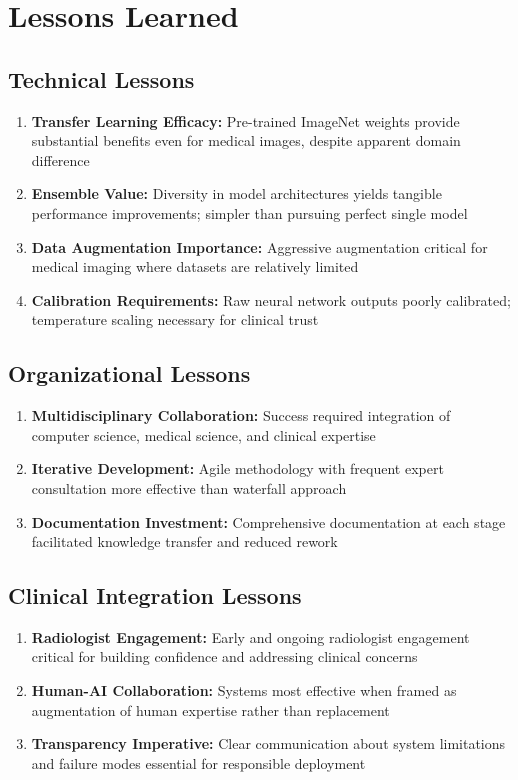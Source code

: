 {\section{Lessons Learned}

\subsection{Technical Lessons}

\begin{enumerate}
    \item \textbf{Transfer Learning Efficacy:} Pre-trained ImageNet weights provide substantial benefits even for medical images, despite apparent domain difference
    \item \textbf{Ensemble Value:} Diversity in model architectures yields tangible performance improvements; simpler than pursuing perfect single model
    \item \textbf{Data Augmentation Importance:} Aggressive augmentation critical for medical imaging where datasets are relatively limited
    \item \textbf{Calibration Requirements:} Raw neural network outputs poorly calibrated; temperature scaling necessary for clinical trust
\end{enumerate}

\subsection{Organizational Lessons}

\begin{enumerate}
    \item \textbf{Multidisciplinary Collaboration:} Success required integration of computer science, medical science, and clinical expertise
    \item \textbf{Iterative Development:} Agile methodology with frequent expert consultation more effective than waterfall approach
    \item \textbf{Documentation Investment:} Comprehensive documentation at each stage facilitated knowledge transfer and reduced rework
\end{enumerate}

\subsection{Clinical Integration Lessons}

\begin{enumerate}
    \item \textbf{Radiologist Engagement:} Early and ongoing radiologist engagement critical for building confidence and addressing clinical concerns
    \item \textbf{Human-AI Collaboration:} Systems most effective when framed as augmentation of human expertise rather than replacement
    \item \textbf{Transparency Imperative:} Clear communication about system limitations and failure modes essential for responsible deployment
\end{enumerate}

}
